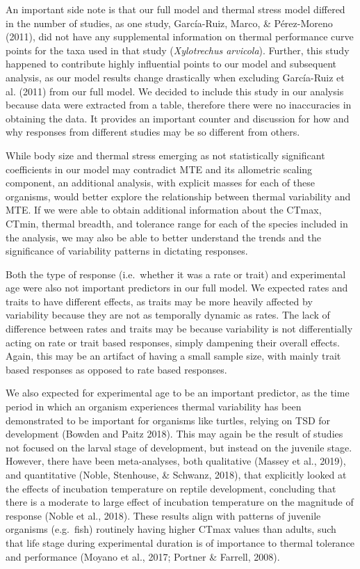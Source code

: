 \documentclass[12pt,twoside]{reedthesis}
\begin{document}
An important side note is that our full model and thermal stress model differed in the number of studies, as one study, García-Ruiz, Marco, \& Pérez-Moreno (2011), did not have any supplemental information on thermal performance curve points for the taxa used in that study (\emph{Xylotrechus arvicola}). Further, this study happened to contribute highly influential points to our model and subsequent analysis, as our model results change drastically when excluding García-Ruiz et al. (2011) from our full model. We decided to include this study in our analysis because data were extracted from a table, therefore there were no inaccuracies in obtaining the data. It provides an important counter and discussion for how and why responses from different studies may be so different from others.

While body size and thermal stress emerging as not statistically significant coefficients in our model may contradict MTE and its allometric scaling component, an additional analysis, with explicit masses for each of these organisms, would better explore the relationship between thermal variability and MTE. If we were able to obtain additional information about the CTmax, CTmin, thermal breadth, and tolerance range for each of the species included in the analysis, we may also be able to better understand the trends and the significance of variability patterns in dictating responses.

Both the type of response (i.e.~whether it was a rate or trait) and experimental age were also not important predictors in our full model. We expected rates and traits to have different effects, as traits may be more heavily affected by variability because they are not as temporally dynamic as rates. The lack of difference between rates and traits may be because variability is not differentially acting on rate or trait based responses, simply dampening their overall effects. Again, this may be an artifact of having a small sample size, with mainly trait based responses as opposed to rate based responses.

We also expected for experimental age to be an important predictor, as the time period in which an organism experiences thermal variability has been demonstrated to be important for organisms like turtles, relying on TSD for development (Bowden and Paitz 2018). This may again be the result of studies not focused on the larval stage of development, but instead on the juvenile stage. However, there have been meta-analyses, both qualitative (Massey et al., 2019), and quantitative (Noble, Stenhouse, \& Schwanz, 2018), that explicitly looked at the effects of incubation temperature on reptile development, concluding that there is a moderate to large effect of incubation temperature on the magnitude of response (Noble et al., 2018). These results align with patterns of juvenile organisms (e.g.~fish) routinely having higher CTmax values than adults, such that life stage during experimental duration is of importance to thermal tolerance and performance (Moyano et al., 2017; Portner \& Farrell, 2008).
\end{document}
